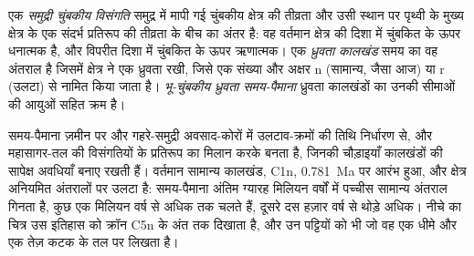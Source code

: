 \begin{definition}[समुद्री चुंबकीय विसंगति; ध्रुवता कालखंड; ध्रुवता समय-पैमाना]\label{def:b1:plate-kinematics:magnetic-anomaly}
एक \emph{समुद्री चुंबकीय विसंगति} समुद्र में मापी गई चुंबकीय क्षेत्र की तीव्रता और उसी स्थान पर पृथ्वी के मुख्य क्षेत्र के एक संदर्भ प्रतिरूप की तीव्रता के बीच का अंतर है: वह वर्तमान क्षेत्र की दिशा में चुंबकित  के ऊपर धनात्मक है, और विपरीत दिशा में चुंबकित  के ऊपर ऋणात्मक। एक \emph{ध्रुवता कालखंड} समय का वह अंतराल है जिसमें क्षेत्र ने एक ध्रुवता रखी, जिसे एक संख्या और अक्षर n (सामान्य, जैसा आज) या r (उलटा) से नामित किया जाता है। \emph{भू-चुंबकीय ध्रुवता समय-पैमाना} ध्रुवता कालखंडों का उनकी सीमाओं की आयुओं सहित क्रम है।
\end{definition}

समय-पैमाना ज़मीन पर और गहरे-समुद्री अवसाद-कोरों में उलटाव-क्रमों की तिथि निर्धारण से, और महासागर-तल की विसंगतियों के प्रतिरूप का मिलान करके बनता है, जिनकी चौड़ाइयाँ कालखंडों की सापेक्ष अवधियाँ बनाए रखती हैं। वर्तमान सामान्य कालखंड, C1n, \qty{0.781}{Ma} पर आरंभ हुआ, और क्षेत्र अनियमित अंतरालों पर उलटा है: समय-पैमाना अंतिम ग्यारह मिलियन वर्षों में पच्चीस सामान्य अंतराल गिनता है, कुछ एक मिलियन वर्ष से अधिक तक चलते हैं, दूसरे दस हज़ार वर्ष से थोड़े अधिक। नीचे का चित्र उस इतिहास को क्रॉन C5n के अंत तक दिखाता है, और उन पट्टियों को भी जो वह एक धीमे और एक तेज़ कटक के तल पर लिखता है।


